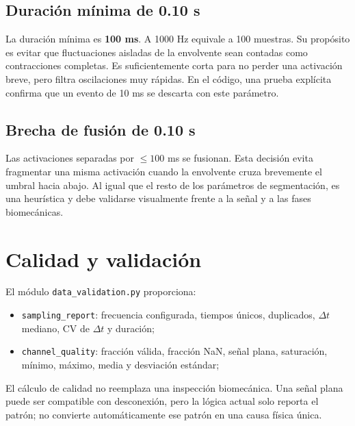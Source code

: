 \documentclass[11pt,spanish]{article}
\begin{document}
\subsection{Duración mínima de 0.10 s}

La duración mínima es \textbf{100 ms}. A 1000 Hz equivale a 100 muestras. Su propósito es evitar que fluctuaciones aisladas de la envolvente sean contadas como contracciones completas. Es suficientemente corta para no perder una activación breve, pero filtra oscilaciones muy rápidas. En el código, una prueba explícita confirma que un evento de 10 ms se descarta con este parámetro.

\subsection{Brecha de fusión de 0.10 s}

Las activaciones separadas por $\leq100$ ms se fusionan. Esta decisión evita fragmentar una misma activación cuando la envolvente cruza brevemente el umbral hacia abajo. Al igual que el resto de los parámetros de segmentación, es una heurística y debe validarse visualmente frente a la señal y a las fases biomecánicas.

\section{Calidad y validación}

El módulo \texttt{data\_validation.py} proporciona:
\begin{itemize}
    \item \texttt{sampling\_report}: frecuencia configurada, tiempos únicos, duplicados, $\Delta t$ mediano, CV de $\Delta t$ y duración;
    \item \texttt{channel\_quality}: fracción válida, fracción NaN, señal plana, saturación, mínimo, máximo, media y desviación estándar;
\end{itemize}

El cálculo de calidad no reemplaza una inspección biomecánica. Una señal plana puede ser compatible con desconexión, pero la lógica actual solo reporta el patrón; no convierte automáticamente ese patrón en una causa física única.
\end{document}

